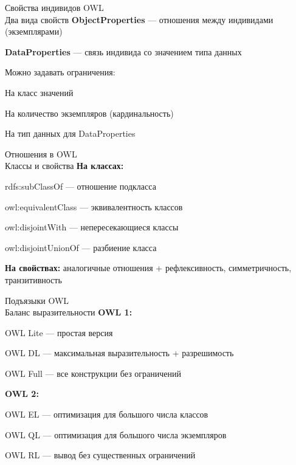\begin{frame}{Свойства индивидов OWL\\Два вида свойств}
	\topline
	\justifying
	\textbf{ObjectProperties} --- отношения между индивидами (экземплярами)
	
	\textbf{DataProperties} --- связь индивида со значением типа данных
	
	\vspace{0.5cm}
	Можно задавать ограничения:
	\begin{textitemize}
		\item На класс значений
		\item На количество экземпляров (кардинальность)
		\item На тип данных для DataProperties
	\end{textitemize}
\end{frame}

\begin{frame}{Отношения в OWL\\Классы и свойства}
	\topline
	\justifying
	\textbf{На классах:}
	\begin{textitemize}
		\item rdfs:subClassOf --- отношение подкласса
		\item owl:equivalentClass --- эквивалентность классов
		\item owl:disjointWith --- непересекающиеся классы
		\item owl:disjointUnionOf --- разбиение класса
	\end{textitemize}
	
	\textbf{На свойствах:} аналогичные отношения + рефлексивность, симметричность, транзитивность
\end{frame}

\begin{frame}{Подъязыки OWL\\Баланс выразительности}
	\topline
	\justifying
	\textbf{OWL 1:}
	\begin{textitemize}
		\item OWL Lite --- простая версия
		\item OWL DL --- максимальная выразительность + разрешимость
		\item OWL Full --- все конструкции без ограничений
	\end{textitemize}
	
	\textbf{OWL 2:}
	\begin{textitemize}
		\item OWL EL --- оптимизация для большого числа классов
		\item OWL QL --- оптимизация для большого числа экземпляров
		\item OWL RL --- вывод без существенных ограничений
	\end{textitemize}
\end{frame}

